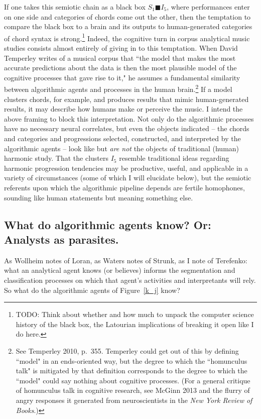 If one takes this semiotic chain as a black box $S_1 \blacksquare I_5$, where performances enter on one side and categories of chords come out the other, then the temptation to compare the black box to a brain and its outputs to human-generated categories of chord syntax is strong.\footnote{TODO: Think about whether and how much to unpack the computer science history of the black box, the Latourian implications of breaking it open like I do here.}  Indeed, the cognitive turn in corpus analytical music studies consists almost entirely of giving in to this temptation.  When David Temperley writes of a musical corpus that ``the model that makes the most accurate predictions about the data is then the most plausible model of the cognitive processes that gave rise to it," he assumes a fundamental similarity between algorithmic agents and processes in the human brain.\footnote{See Temperley 2010, p.\ 355.  Temperley could get out of this by defining ``model" in an ends-oriented way, but the degree to which the ``homunculus talk" is mitigated by that definition corresponds to the degree to which the ``model" could say nothing about cognitive processes.  (For a general critique of homunculus talk in cognitive research, see McGinn 2013 and the flurry of angry responses it generated from neuroscientists in the \emph{New York Review of Books}.)}  If a model clusters chords, for example, and produces results that mimic human-generated results, it may describe how humans make or perceive the music.  I intend the above framing to block this interpretation.  Not only do the algorithmic processes have no necessary neural correlates, but even the objects indicated -- the chords and categories and progressions selected, constructed, and interpreted by the algorithmic agents -- look like but \emph{are not} the objects of traditional (human) harmonic study.  That the clusters $I_5$ resemble traditional ideas regarding harmonic progression tendencies may be productive, useful, and applicable in a variety of circumstances (some of which I will elucidate below), but the semiotic referents upon which the algorithmic pipeline depends are fertile homophones, sounding like human statements but meaning something else.

\subsection{What do algorithmic agents know?  Or: Analysts as parasites.}
As Wollheim notes of Loran, as Waters notes of Strunk, as I note of Terefenko: what an analytical agent knows (or believes) informs the segmentation and classification processes on which that agent's activities and interpretants will rely.  So what do the algorithmic agents of Figure~\ref{k_j} know?

